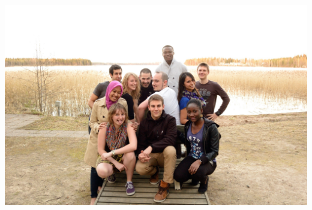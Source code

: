 \documentclass[10pt,a4paper]{article} %
\begin{document}
\begin{center}
	\vspace{10pt}
	\includegraphics[width=0.8\linewidth]{media/perccom_family.jpg} %

	\vspace{10pt}
\end{center}
\end{document}

